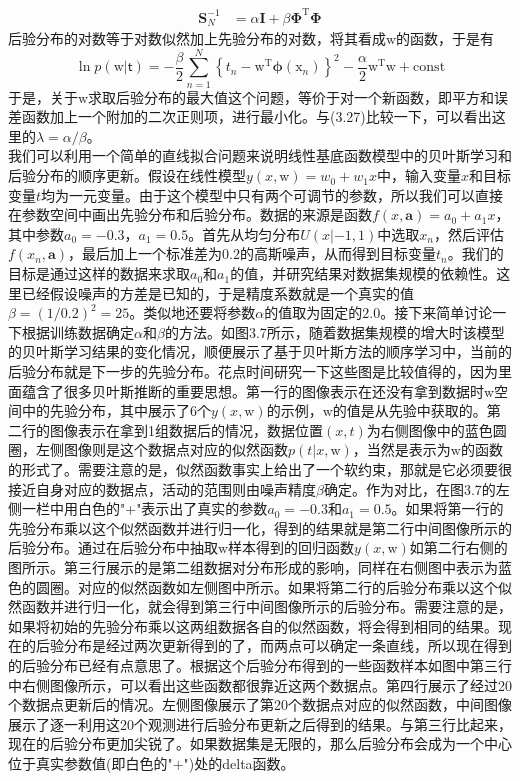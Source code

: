 \documentclass[b5paper]{book}
\numberwithin{equation}{chapter}
\newcommand {\bx} {\boldsymbol{\mathrm{x}}}
\newcommand {\bw} {\boldsymbol{\mathrm{w}}}
\newcommand {\sft} {\boldsymbol{\mathsf{t}}}
\newcommand {\rmT} {\mathrm{T}}
\newcommand {\bfPhi} {\boldsymbol{\Phi}}
\newcommand {\bfphi} {\boldsymbol{\phi}}
\begin{document}
{\begin{align}
		\mathbf{S}_N^{-1} &= \alpha \mathbf{I} + \beta \bfPhi^{\rmT} \bfPhi
	\end{align}
	\indent 后验分布的对数等于对数似然加上先验分布的对数，将其看成$\bw$的函数，于是有
	\begin{equation}
		\ln p(\bw | \sft) = -\frac{\beta}{2}\sum_{n=1}^N \left\{t_n - \bw^{\rmT}\bfphi(\bx_n)\right\}^2 -\frac{\alpha}{2}\bw^{\rmT}\bw + \mathrm{const}
	\end{equation}
	于是，关于$\bw$求取后验分布的最大值这个问题，等价于对一个新函数，即平方和误差函数加上一个附加的二次正则项，进行最小化。与(3.27)比较一下，可以看出这里的$\lambda = \alpha / \beta$。\\
	\indent 我们可以利用一个简单的直线拟合问题来说明线性基底函数模型中的贝叶斯学习和后验分布的顺序更新。假设在线性模型$y(x,\bw) = w_0 + w_1 x$中，输入变量$x$和目标变量$t$均为一元变量。由于这个模型中只有两个可调节的参数，所以我们可以直接在参数空间中画出先验分布和后验分布。数据的来源是函数$f(x,\mathbf{a})=a_0 + a_1 x$，其中参数$a_0 = -0.3$，$a_1 = 0.5$。首先从均匀分布$U(x|-1,1)$中选取$x_n$，然后评估$f(x_n, \mathbf{a})$，最后加上一个标准差为$0.2$的高斯噪声，从而得到目标变量$t_n$。我们的目标是通过这样的数据来求取$a_0$和$a_1$的值，并研究结果对数据集规模的依赖性。这里已经假设噪声的方差是已知的，于是精度系数就是一个真实的值$\beta = (1/0.2)^2 = 25$。类似地还要将参数$\alpha$的值取为固定的$2.0$。接下来简单讨论一下根据训练数据确定$\alpha$和$\beta$的方法。如图3.7所示，随着数据集规模的增大时该模型的贝叶斯学习结果的变化情况，顺便展示了基于贝叶斯方法的顺序学习中，当前的后验分布就是下一步的先验分布。花点时间研究一下这些图是比较值得的，因为里面蕴含了很多贝叶斯推断的重要思想。第一行的图像表示在还没有拿到数据时$\bw$空间中的先验分布，其中展示了6个$y(x,\bw)$的示例，$\bw$的值是从先验中获取的。第二行的图像表示在拿到1组数据后的情况，数据位置$(x,t)$为右侧图像中的蓝色圆圈，左侧图像则是这个数据点对应的似然函数$p(t|x,\bw)$，当然是表示为$\bw$的函数的形式了。需要注意的是，似然函数事实上给出了一个软约束，那就是它必须要很接近自身对应的数据点，活动的范围则由噪声精度$\beta$确定。作为对比，在图3.7的左侧一栏中用白色的"+"表示出了真实的参数$a_0 = -0.3$和$a_1 = 0.5$。如果将第一行的先验分布乘以这个似然函数并进行归一化，得到的结果就是第二行中间图像所示的后验分布。通过在后验分布中抽取$\bw$样本得到的回归函数$y(x,\bw)$如第二行右侧的图所示。第三行展示的是第二组数据对分布形成的影响，同样在右侧图中表示为蓝色的圆圈。对应的似然函数如左侧图中所示。如果将第二行的后验分布乘以这个似然函数并进行归一化，就会得到第三行中间图像所示的后验分布。需要注意的是，如果将初始的先验分布乘以这两组数据各自的似然函数，将会得到相同的结果。现在的后验分布是经过两次更新得到的了，而两点可以确定一条直线，所以现在得到的后验分布已经有点意思了。根据这个后验分布得到的一些函数样本如图中第三行中右侧图像所示，可以看出这些函数都很靠近这两个数据点。第四行展示了经过20个数据点更新后的情况。左侧图像展示了第20个数据点对应的似然函数，中间图像展示了逐一利用这20个观测进行后验分布更新之后得到的结果。与第三行比起来，现在的后验分布更加尖锐了。如果数据集是无限的，那么后验分布会成为一个中心位于真实参数值(即白色的"+")处的delta函数。
}
\end{document}
